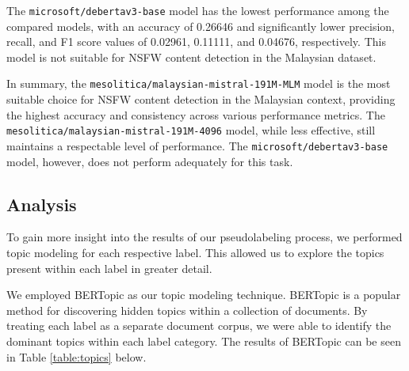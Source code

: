 \documentclass[preprint]{article}
\begin{document}
The \texttt{microsoft/debertav3-base} model has the lowest performance among the compared models, with an accuracy of 0.26646 and significantly lower precision, recall, and F1 score values of 0.02961, 0.11111, and 0.04676, respectively. This model is not suitable for NSFW content detection in the Malaysian dataset.

In summary, the \texttt{mesolitica/malaysian-mistral-191M-MLM} model is the most suitable choice for NSFW content detection in the Malaysian context, providing the highest accuracy and consistency across various performance metrics. The \texttt{mesolitica/malaysian-mistral-191M-4096} model, while less effective, still maintains a respectable level of performance. The \texttt{microsoft/debertav3-base} model, however, does not perform adequately for this task.

\subsection{Analysis}

To gain more insight into the results of our pseudolabeling process, we performed topic modeling for each respective label. This allowed us to explore the topics present within each label in greater detail.

We employed BERTopic as our topic modeling technique. BERTopic is a popular method for discovering hidden topics within a collection of documents. By treating each label as a separate document corpus, we were able to identify the dominant topics within each label category. The results of BERTopic can be seen in Table \ref*{table:topics} below.
\end{document}
